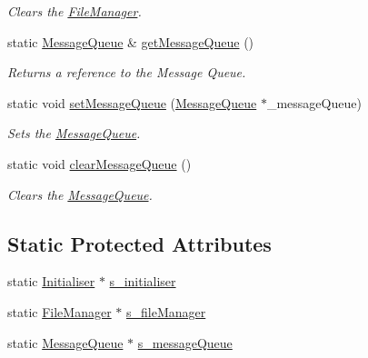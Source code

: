 \begin{DoxyCompactItemize}
\begin{DoxyCompactList}\small\item\em Clears the \hyperlink{class_cookie_eng_1_1_services_1_1_file_manager}{File\+Manager}. \end{DoxyCompactList}\item 
static \hyperlink{class_cookie_eng_1_1_services_1_1_message_queue}{Message\+Queue} \& \hyperlink{class_cookie_eng_1_1_services_1_1_service_locator_a3acc403cde719caada08b5cf9327ad24}{get\+Message\+Queue} ()
\begin{DoxyCompactList}\small\item\em Returns a reference to the Message Queue. \end{DoxyCompactList}\item 
static void \hyperlink{class_cookie_eng_1_1_services_1_1_service_locator_aafa67e5c104a89681d41937b4deaad9d}{set\+Message\+Queue} (\hyperlink{class_cookie_eng_1_1_services_1_1_message_queue}{Message\+Queue} $\ast$\+\_\+message\+Queue)
\begin{DoxyCompactList}\small\item\em Sets the \hyperlink{class_cookie_eng_1_1_services_1_1_message_queue}{Message\+Queue}. \end{DoxyCompactList}\item 
static void \hyperlink{class_cookie_eng_1_1_services_1_1_service_locator_a1354419abaf9ead394541a24f64bb5fa}{clear\+Message\+Queue} ()
\begin{DoxyCompactList}\small\item\em Clears the \hyperlink{class_cookie_eng_1_1_services_1_1_message_queue}{Message\+Queue}. \end{DoxyCompactList}\end{DoxyCompactItemize}
\subsection*{Static Protected Attributes}
\begin{DoxyCompactItemize}
\item 
static \hyperlink{class_cookie_eng_1_1_services_1_1_initialiser}{Initialiser} $\ast$ \hyperlink{class_cookie_eng_1_1_services_1_1_service_locator_a4016a14884b5701e26047bd9e9404c20}{s\+\_\+initialiser}
\item 
static \hyperlink{class_cookie_eng_1_1_services_1_1_file_manager}{File\+Manager} $\ast$ \hyperlink{class_cookie_eng_1_1_services_1_1_service_locator_a98841ef7f94fae563997ce5bc2d6e507}{s\+\_\+file\+Manager}
\item 
static \hyperlink{class_cookie_eng_1_1_services_1_1_message_queue}{Message\+Queue} $\ast$ \hyperlink{class_cookie_eng_1_1_services_1_1_service_locator_a69ae2c1a6385322f36009b87c90cc0de}{s\+\_\+message\+Queue}
\end{DoxyCompactItemize}


